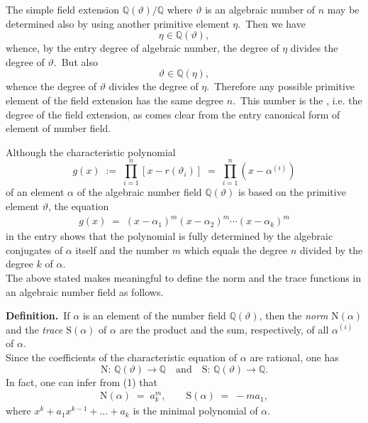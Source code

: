 \documentclass[12pt]{article}
\theoremstyle{definition}
\begin{document}

The simple field extension $\mathbb{Q}(\vartheta)/\mathbb{Q}$ where $\vartheta$ is an algebraic number of  $n$ may be determined also by using another primitive element $\eta$.\, Then we have
$$\eta \in \mathbb{Q}(\vartheta),$$
whence, by the entry degree of algebraic number, the degree of $\eta$ divides the degree of $\vartheta$.\, But also
$$\vartheta \in \mathbb{Q}(\eta),$$
whence the degree of $\vartheta$ divides the degree of $\eta$.\, Therefore any possible primitive element of the field extension has the same degree $n$.\, This number is the , i.e. the degree of the field extension, as comes clear from the entry canonical form of element of number field.

Although the characteristic polynomial
$$g(x) \;:=\; \prod_{i=1}^n[x-r(\vartheta_i)] \;=\; \prod_{i=1}^n(x-\alpha^{(i)})$$
of an element $\alpha$ of the algebraic number field $\mathbb{Q}(\vartheta)$ is based on the primitive element 
$\vartheta$, the equation 
\begin{align}
g(x) \;=\; (x-\alpha_1)^m(x-\alpha_2)^m\cdots(x-\alpha_k)^m
\end{align}
in the entry  shows that the polynomial is fully determined by the algebraic conjugates of $\alpha$ itself and the number $m$ which equals the degree $n$ divided by the degree $k$ of 
$\alpha$. \\

The above stated makes meaningful to define the norm and the trace functions in an algebraic number field as follows.

\textbf{Definition.}\, If $\alpha$ is an element of the number field $\mathbb{Q}(\vartheta)$, then the \emph{norm} 
$\mbox{N}(\alpha)$ and the \emph{trace} $\mbox{S}(\alpha)$ of $\alpha$ are the product and the sum, respectively, of all  $\alpha^{(i)}$ of $\alpha$.\\


Since the coefficients of the characteristic equation of $\alpha$ are rational, one has
$$\mbox{N}\!:\,\mathbb{Q}(\vartheta) \to \mathbb{Q} \quad\mbox{and}\quad 
  \mbox{S}\!:\,\mathbb{Q}(\vartheta) \to \mathbb{Q}.$$
In fact, one can infer from (1) that
\begin{align}
\mbox{N}(\alpha) \;=\; a_k^m, \qquad \mbox{S}(\alpha) \;=\; -ma_1,
\end{align}
where $x^k\!+\!a_1x^{k-1}\!+\ldots+\!a_k$ is the minimal polynomial of $\alpha$.



\end{document}
